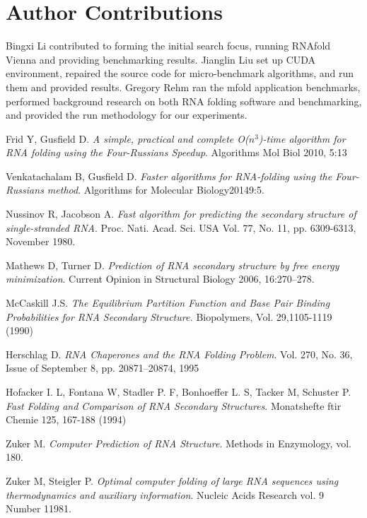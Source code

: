 \documentclass[12pt]{article}
\begin{document}
\section{Author Contributions}
Bingxi Li contributed to forming the initial search focus, running RNAfold Vienna and providing benchmarking results. 
Jianglin Liu set up CUDA environment, repaired the source code for micro-benchmark algorithms, and run them and provided 
results. Gregory Rehm ran the mfold application benchmarks, performed background research on both RNA folding software 
and benchmarking, and provided the run methodology for our experiments.
\begin{thebibliography}{56}
Frid Y, Gusfield D.
\textit{A simple, practical and complete O($n^3$)-time
algorithm for RNA folding using the Four-Russians Speedup}.
Algorithms Mol Biol 2010, 5:13

Venkatachalam B, Gusfield D.
\textit{Faster algorithms for RNA-folding using the Four-Russians method}.
Algorithms for Molecular Biology20149:5.

Nussinov R, Jacobson A.
\textit{Fast algorithm for predicting the secondary structure of
single-stranded RNA}.
Proc. Nati. Acad. Sci. USA Vol. 77, No. 11, pp. 6309-6313, November 1980.

Mathews D, Turner D.
\textit{Prediction of RNA secondary structure by free energy
minimization}.
Current Opinion in Structural Biology 2006, 16:270–278.

McCaskill J.S.
\textit{The Equilibrium Partition Function and Base Pair
Binding Probabilities for RNA Secondary Structure.}
Biopolymers, Vol. 29,1105-1119 (1990)

Herschlag D.
\textit{RNA Chaperones and the RNA Folding Problem}.
Vol. 270, No. 36, Issue of September 8, pp. 20871–20874, 1995

Hofacker I. L, Fontana W, Stadler P. F, Bonhoeffer L. S, Tacker M, Schuster P.
\textit{Fast Folding and Comparison of RNA Secondary Structures}.
Monatshefte ftir Chemie 125, 167-188 (1994)

Zuker M.
\textit{Computer Prediction of RNA Structure}.
Methods in Enzymology, vol. 180.

Zuker M, Steigler P.
\textit{Optimal computer folding of large RNA sequences using thermodynamics and auxiliary information}.
Nucleic Acids Research vol. 9 Number 11981.


\end{thebibliography}
\end{document}

